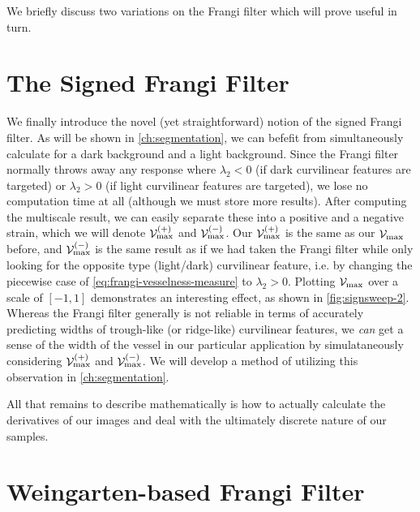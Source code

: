     We briefly discuss two variations on the Frangi filter which will prove useful in turn.



\section{The Signed Frangi Filter} \label{sec:signed-frangi-filter}
We finally introduce the novel (yet straightforward) notion of the signed Frangi filter. As will be shown in \cref{ch:segmentation}, we can befefit from simultaneously calculate for a dark background and a light background. Since the Frangi filter normally throws away any response where $\lambda_2 < 0$ (if dark curvilinear features are targeted) or $\lambda_2 >0$ (if light curvilinear features are targeted), we lose no computation time at all (although we must store more results). After computing the multiscale result, we can easily separate these into a positive and a negative strain, which we will denote
$\mathcal{V}_{\max}^{(+)}$ and $\mathcal{V}_{\max}^{(-)}$. Our $\mathcal{V}_{\max}^{(+)}$ is the same as our $\mathcal{V}_{\max}$ before, and $\mathcal{V}_{\max}^{(-)}$ is the same result as if we had taken the Frangi filter while only looking for the opposite type (light/dark) curvilinear feature, i.e. by changing the piecewise case of \cref{eq:frangi-vesselness-measure} to $\lambda_2 > 0$. Plotting $\mathcal{V}_{\max}$ over a scale of $[-1,1]$ demonstrates an interesting effect, as shown in \cref{fig:signsweep-2}. Whereas the Frangi filter generally is not reliable in terms of accurately predicting widths of trough-like (or ridge-like) curvilinear features, we \textit{can} get a sense of the width of the vessel in our particular application by simulataneously considering $\mathcal{V}^{(+)}_{\max}$ and $\mathcal{V}^{(-)}_{\max}$. We will develop a method of utilizing this observation in \cref{ch:segmentation}.


All that remains to describe mathematically is how to actually calculate the derivatives of our images and deal with the ultimately discrete nature of our samples.

\section{Weingarten-based Frangi Filter} \label{sec:wein-frangi}

